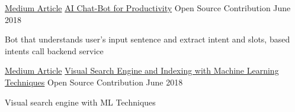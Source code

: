 

\begin{cventries}


  \cventry
    {\href{https://medium.com/@ishwarsawale/ai-chat-bot-for-productivity-5ce72a1eac87}{Medium Article}} %
    {\href{https://medium.com/@ishwarsawale/ai-chat-bot-for-productivity-5ce72a1eac87}{AI Chat-Bot for Productivity}} %
    {Open Source Contribution} %
    {June 2018} %
    {
      \begin{cvitems} %
        \item {Bot that understands user's input sentence and extract intent and slots, based intents call backend service}
      \end{cvitems}
    }

  \cventry
    {\href{https://medium.com/@ishwarsawale/visual-search-engine-and-indexing-with-machine-learning-techniques-651f3a59bf69}{Medium Article}} %
    {\href{https://medium.com/@ishwarsawale/visual-search-engine-and-indexing-with-machine-learning-techniques-651f3a59bf69}{Visual Search Engine and Indexing with Machine Learning Techniques}} %
    {Open Source Contribution} %
    {June 2018} %
    {
      \begin{cvitems} %
        \item {Visual search engine with ML Techniques}
      \end{cvitems}
    }


\end{cventries}
